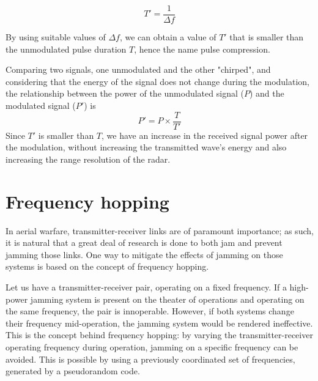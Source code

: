 \documentclass[english,purist]{ist-report}
\begin{document}
$$
T' = \frac{1}{\Delta f}
$$

By using suitable values of $\Delta f$, we can obtain a value of $T'$ that is smaller than the unmodulated pulse duration $T$, hence the name pulse compression.

Comparing two signals, one unmodulated and the other "chirped", and considering that the energy of the signal does not change during the modulation, the relationship between the power of the unmodulated signal ($P$) and the modulated signal ($P'$) is
$$
P' = P \times \frac{T}{T'}
$$
Since $T'$ is smaller than $T$, we have an increase in the received signal power after the modulation, without increasing the transmitted wave's energy and also increasing the range resolution of the radar.


\section{Frequency hopping}

In aerial warfare, transmitter-receiver links are of paramount importance; as such, it is natural that a great deal of research is done to both jam and prevent jamming those links. One way to mitigate the effects of jamming on those systems is based on the concept of frequency hopping.

Let us have a transmitter-receiver pair, operating on a fixed frequency. If a high-power jamming system is present on the theater of operations and operating on the same frequency, the pair is innoperable. However, if both systems change their frequency mid-operation, the jamming system would be rendered ineffective. This is the concept behind frequency hopping: by varying the transmitter-receiver operating frequency during operation, jamming on a specific frequency can be avoided. This is possible by using a previously coordinated set of frequencies, generated by a pseudorandom code.
\end{document}

